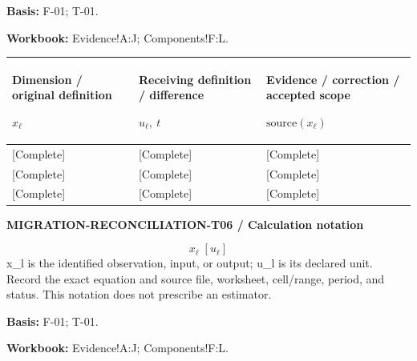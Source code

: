 \textbf{Basis:} F-01; T-01.\par
\textbf{Workbook:} Evidence!A:J; Components!F:L.\par\endgroup
{\sffamily\fontsize{8.3}{10.3}\selectfont\begin{longtable}{@{}P{54.83mm} P{54.83mm} P{54.83mm}@{}}
\toprule
\textbf{Dimension / original definition}\par {\normalfont\fontsize{8.2}{10}\selectfont $x_{\ell}$} & \textbf{Receiving definition / difference}\par {\normalfont\fontsize{8.2}{10}\selectfont $u_{\ell},\ t$} & \textbf{Evidence / correction / accepted scope}\par {\normalfont\fontsize{8.2}{10}\selectfont $\text{source}(x_{\ell})$}\\\midrule\endhead
\rule{0pt}{8mm}[Complete] & [Complete] & [Complete]\\\hline
\rule{0pt}{8mm}[Complete] & [Complete] & [Complete]\\\hline
\rule{0pt}{8mm}[Complete] & [Complete] & [Complete]\\\hline
\end{longtable}}
\par\begingroup\sffamily\fontsize{8}{10}\selectfont\color{NEBGreen}\setlength{\parskip}{2pt}\setlength{\abovedisplayskip}{4pt}\setlength{\belowdisplayskip}{4pt}\setlength{\abovedisplayshortskip}{2pt}\setlength{\belowdisplayshortskip}{3pt}
\textbf{MIGRATION-RECONCILIATION-T06 / Calculation notation}\par
{\fontsize{9}{11}\selectfont\[ x_{\ell}\;[u_{\ell}] \]}
x\_l is the identified observation, input, or output; u\_l is its declared unit. Record the exact equation and source file, worksheet, cell/range, period, and status. This notation does not prescribe an estimator.\par
\textbf{Basis:} F-01; T-01.\par
\textbf{Workbook:} Evidence!A:J; Components!F:L.\par\endgroup
